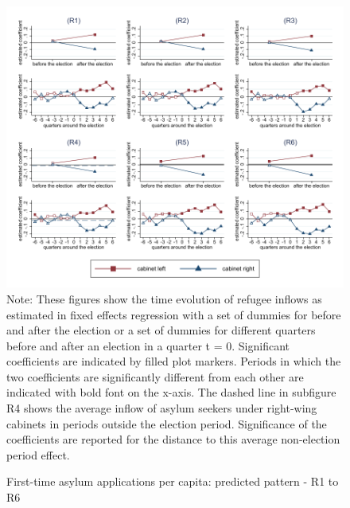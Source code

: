 \documentclass[11pt,a4paper]{scrartcl}
\begin{document}
\clearpage
\FloatBarrier




\clearpage
\FloatBarrier
\begin{figure}[!ht]
	\caption{First-time asylum applications per capita: predicted pattern - R1 to R6}
	\includegraphics[width=1\textwidth]{../results/applications/app_graphs_R1-R6.pdf}
	\scriptsize{Note: These figures show the time evolution of refugee inflows as estimated in fixed effects regression
		with a set of dummies for before and after the election or a set of dummies for different quarters before and after an election in a quarter t = 0. Significant coefficients are indicated by filled plot markers. Periods in which the two coefficients are significantly different from each other are indicated with bold font on the x-axis. The dashed line in subfigure R4 shows the average inflow of asylum seekers under right-wing cabinets in periods outside the election period. Significance of the coefficients are reported for the distance to this average non-election period effect.}
\end{figure}

\clearpage
\FloatBarrier



\clearpage
\FloatBarrier


\clearpage
\FloatBarrier


\end{document}
